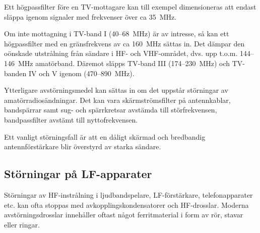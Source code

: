 Ett högpassfilter före en TV-mottagare kan till exempel dimensioneras att endast släppa
igenom signaler med frekvenser över ca 35~MHz.

Om inte mottagning i TV-band I (40--68~MHz) är av intresse, så kan ett
högpassfilter med en gränsfrekvens av ca 160~MHz sättas in.
Det dämpar den oönskade utstrålning från sändare i HF- och VHF-området,
dvs. upp t.o.m. 144--146~MHz amatörband.
Däremot släpps TV-band III (174--230~MHz) och TV-banden IV och V igenom
(470--890~MHz).

Ytterligare avstörningsmedel kan sättas in om det uppstår störningar av
amatörradiosändningar.
Det kan vara skärmströmsfilter på antennkablar, bandspärrar samt sug- och
spärrkretsar avstämda till störfrekvensen, bandpassfilter avstämt till
nyttofrekvensen.

Ett vanligt störningsfall är att en dåligt skärmad och bredbandig
antennförstärkare blir överstyrd av starka sändare.

\subsection{Störningar på LF-apparater}

Störningar av HF-instrålning i ljudbandspelare, LF-förstärkare, telefonapparater
etc. kan ofta stoppas med avkopplingskondensatorer och HF-drosslar.
Moderna avstörningsdrosslar innehåller oftast något ferritmaterial i form av
rör, stavar eller ringar.
